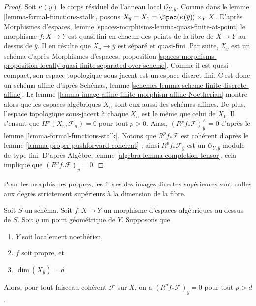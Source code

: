 \begin{proof}
Soit $\kappa(\overline{y})$ le corps résiduel de l'anneau
local $\mathcal{O}_{Y, \overline{y}}$. Comme dans le
lemme \ref{lemma-formal-functions-stalk},
posons $X_{\overline{y}} = X_1 = \Spec(\kappa(\overline{y})) \times_Y X$.
D'après Morphismes d'espaces, lemme
\ref{spaces-morphisms-lemma-quasi-finite-at-point}
le morphisme $f : X \to Y$ est quasi-fini en chacun
des points de la fibre de $X \to Y$ au-dessus de $\overline{y}$.
Il en résulte que $X_{\overline{y}} \to \overline{y}$ est séparé et
quasi-fini. Par suite, $X_{\overline{y}}$ est un schéma
d'après Morphismes d'espaces, proposition
\ref{spaces-morphisms-proposition-locally-quasi-finite-separated-over-scheme}.
Comme il est quasi-compact, son espace topologique sous-jacent est un espace
discret fini. C'est donc un schéma affine d'après
Schémas, lemme \ref{schemes-lemma-scheme-finite-discrete-affine}.
Le lemme \ref{lemma-image-affine-finite-morphism-affine-Noetherian}
montre alors que les espaces algébriques $X_n$ sont eux aussi des schémas affines.
De plus, l'espace topologique sous-jacent à chaque $X_n$ est le même
que celui de $X_1$. Il s'ensuit que $H^p(X_n, \mathcal{F}_n) = 0$
pour tout $p > 0$. Ainsi,
$(R^pf_*\mathcal{F})_{\overline{y}}^\wedge = 0$
d'après le lemme \ref{lemma-formal-functions-stalk}.
Notons que $R^pf_*\mathcal{F}$ est cohérent d'après le
lemme \ref{lemma-proper-pushforward-coherent} ;
ainsi $R^pf_*\mathcal{F}_{\overline{y}}$ est un
$\mathcal{O}_{Y, \overline{y}}$-module de type fini.
D'après Algèbre, lemme \ref{algebra-lemma-completion-tensor},
cela implique que $(R^pf_*\mathcal{F})_{\overline{y}} = 0$.
\end{proof}

\begin{lemma}
\label{lemma-higher-direct-images-zero-above-dimension-fibre}
\begin{slogan}
Pour les morphismes propres, les fibres des images directes supérieures sont nulles aux degrés
strictement supérieurs à la dimension de la fibre.
\end{slogan}
Soit $S$ un schéma.
Soit $f : X \to Y$ un morphisme d'espaces algébriques au-dessus de $S$.
Soit $\overline{y}$ un point géométrique de $Y$.
Supposons que
\begin{enumerate}
\item $Y$ soit localement noethérien,
\item $f$ soit propre, et
\item $\dim(X_{\overline{y}}) = d$.
\end{enumerate}
Alors, pour tout faisceau cohérent $\mathcal{F}$ sur $X$, on a
$(R^pf_*\mathcal{F})_{\overline{y}} = 0$ pour tout $p > d$.
\end{lemma}


